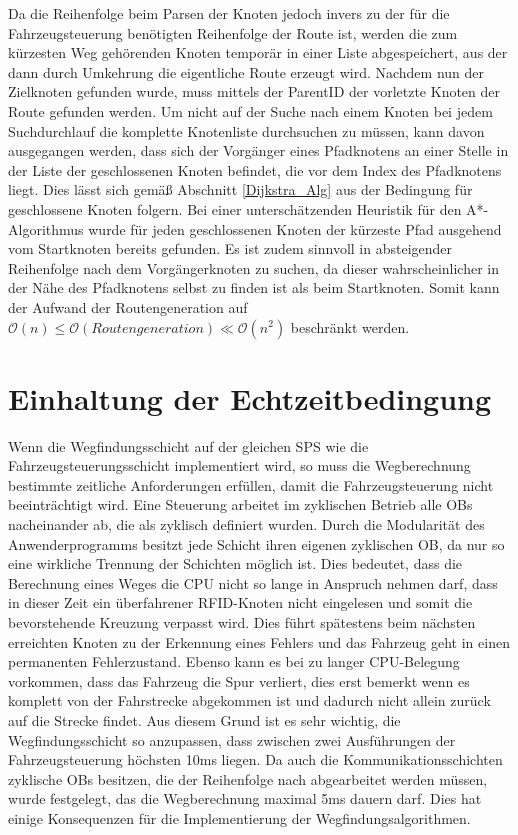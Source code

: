 			Da die Reihenfolge beim Parsen der Knoten jedoch invers zu der für die Fahrzeugsteuerung benötigten Reihenfolge der Route ist, werden die zum kürzesten Weg gehörenden Knoten temporär in einer Liste abgespeichert, aus der dann durch Umkehrung die eigentliche Route erzeugt wird. Nachdem nun der Zielknoten gefunden wurde, muss mittels der ParentID der vorletzte Knoten der Route gefunden werden. Um nicht auf der Suche nach einem Knoten bei jedem Suchdurchlauf die komplette Knotenliste durchsuchen zu müssen, kann davon ausgegangen werden, dass sich der Vorgänger eines Pfadknotens an einer Stelle in der Liste der geschlossenen Knoten befindet, die vor dem  Index des Pfadknotens liegt. Dies lässt sich gemäß Abschnitt \ref{Dijkstra_Alg} aus der Bedingung für geschlossene Knoten folgern. Bei einer unterschätzenden Heuristik für den A*-Algorithmus wurde für jeden geschlossenen Knoten der kürzeste Pfad ausgehend vom Startknoten bereits gefunden. Es ist zudem sinnvoll in absteigender Reihenfolge nach dem Vorgängerknoten zu suchen, da dieser wahrscheinlicher in der Nähe des Pfadknotens selbst zu finden ist als beim Startknoten. Somit kann der Aufwand der Routengeneration auf $\mathcal{O}(n)\le \mathcal{O}(Routengeneration)\ll \mathcal{O}(n^2)$ beschränkt werden.
			
			
	\section{Einhaltung der Echtzeitbedingung}
		\label{Echtzeitbedingung}
		Wenn die Wegfindungsschicht auf der gleichen \ac{SPS} wie die Fahrzeugsteuerungsschicht implementiert wird, so muss die Wegberechnung bestimmte zeitliche Anforderungen erfüllen, damit die Fahrzeugsteuerung nicht beeinträchtigt wird. Eine Steuerung arbeitet im zyklischen Betrieb alle \ac{OB}s nacheinander ab, die als zyklisch definiert wurden. Durch die Modularität des Anwenderprogramms besitzt jede Schicht ihren eigenen zyklischen \ac{OB}, da nur so eine wirkliche Trennung der Schichten möglich ist. Dies bedeutet, dass die Berechnung eines Weges die CPU nicht so lange in Anspruch nehmen darf, dass in dieser Zeit  ein überfahrener RFID-Knoten nicht eingelesen und somit die bevorstehende Kreuzung verpasst wird. Dies führt spätestens beim nächsten erreichten Knoten zu der Erkennung eines Fehlers und das Fahrzeug geht in einen permanenten Fehlerzustand. Ebenso kann es bei zu langer CPU-Belegung vorkommen, dass das Fahrzeug die Spur verliert, dies erst bemerkt wenn es komplett von der Fahrstrecke abgekommen ist und dadurch nicht allein zurück auf die Strecke findet. Aus diesem Grund ist es sehr wichtig, die Wegfindungsschicht so anzupassen, dass zwischen zwei Ausführungen der Fahrzeugsteuerung höchsten 10ms liegen. Da auch die Kommunikationsschichten zyklische \ac{OB}s besitzen, die der Reihenfolge nach abgearbeitet werden müssen, wurde festgelegt, das die Wegberechnung maximal 5ms dauern darf. Dies hat einige Konsequenzen für die Implementierung der Wegfindungsalgorithmen.
		
